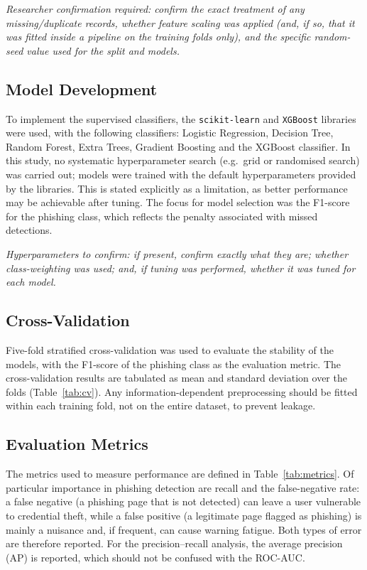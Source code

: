 \documentclass[11pt,a4paper]{article}
\begin{document}
\textit{Researcher confirmation required: confirm the exact treatment of any missing/duplicate
records, whether feature scaling was applied (and, if so, that it was fitted inside a pipeline
on the training folds only), and the specific random-seed value used for the split and models.}

\subsection{Model Development}

To implement the supervised classifiers, the \texttt{scikit-learn} and \texttt{XGBoost}
libraries were used, with the following classifiers: Logistic Regression, Decision Tree,
Random Forest, Extra Trees, Gradient Boosting and the XGBoost classifier. In this study, no
systematic hyperparameter search (e.g.\ grid or randomised search) was carried out; models
were trained with the default hyperparameters provided by the libraries. This is stated
explicitly as a limitation, as better performance may be achievable after tuning. The focus
for model selection was the F1-score for the phishing class, which reflects the penalty
associated with missed detections.

\textit{Hyperparameters to confirm: if present, confirm exactly what they are; whether
class-weighting was used; and, if tuning was performed, whether it was tuned for each model.}

\subsection{Cross-Validation}

Five-fold stratified cross-validation was used to evaluate the stability of the models, with
the F1-score of the phishing class as the evaluation metric. The cross-validation results are
tabulated as mean and standard deviation over the folds (Table~\ref{tab:cv}). Any
information-dependent preprocessing should be fitted within each training fold, not on the
entire dataset, to prevent leakage.

\subsection{Evaluation Metrics}

The metrics used to measure performance are defined in Table~\ref{tab:metrics}. Of particular
importance in phishing detection are recall and the false-negative rate: a false negative (a
phishing page that is not detected) can leave a user vulnerable to credential theft, while a
false positive (a legitimate page flagged as phishing) is mainly a nuisance and, if frequent,
can cause warning fatigue. Both types of error are therefore reported. For the
precision--recall analysis, the average precision (AP) is reported, which should not be
confused with the ROC-AUC.
\end{document}
